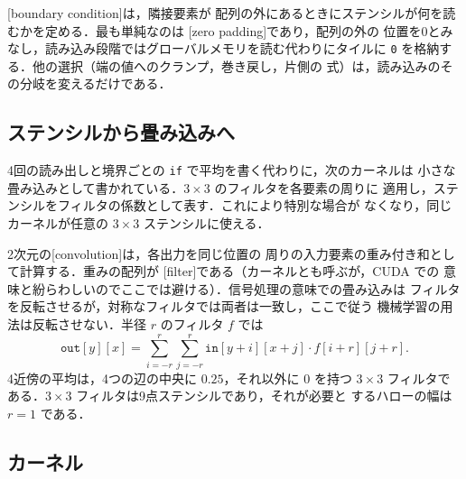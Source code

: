 \documentclass[../main.tex]{subfiles}
\begin{document}
\begin{definition}
  [boundary condition]は，隣接要素が
  配列の外にあるときにステンシルが何を読むかを定める．最も単純なのは
  [zero padding]であり，配列の外の
  位置を0とみなし，読み込み段階ではグローバルメモリを読む代わりにタイルに
  \texttt{0} を格納する．他の選択（端の値へのクランプ，巻き戻し，片側の
  式）は，読み込みのその分岐を変えるだけである．
\end{definition}

\subsection{ステンシルから畳み込みへ}

4回の読み出しと境界ごとの \texttt{if} で平均を書く代わりに，次のカーネルは
小さな畳み込みとして書かれている．$3\times3$ のフィルタを各要素の周りに
適用し，ステンシルをフィルタの係数として表す．これにより特別な場合が
なくなり，同じカーネルが任意の $3\times3$ ステンシルに使える．

\begin{definition}
  2次元の[convolution]は，各出力を同じ位置の
  周りの入力要素の重み付き和として計算する．重みの配列が
  [filter]である（カーネルとも呼ぶが，CUDA での
  意味と紛らわしいのでここでは避ける）．信号処理の意味での畳み込みは
  フィルタを反転させるが，対称なフィルタでは両者は一致し，ここで従う
  機械学習の用法は反転させない．半径 $r$ のフィルタ $f$ では
  \begin{equation}
    \texttt{out}[y][x] = \sum_{i=-r}^{r} \sum_{j=-r}^{r}
      \texttt{in}[y+i][x+j] \cdot f[i+r][j+r].
    \label{eq:l03-convolution}
  \end{equation}
  4近傍の平均は，4つの辺の中央に $0.25$，それ以外に $0$ を持つ $3\times3$
  フィルタである．$3\times3$ フィルタは9点ステンシルであり，それが必要と
  するハローの幅は $r = 1$ である．
\end{definition}

\subsection{カーネル}

\begin{marginfigure}
  \resizebox{\linewidth}{!}{}
  \caption{1つのブロック内のスレッドの役割（$8\times8$ スレッドで描画）：
    外周のスレッドはハローセルを読み込むだけで，内側のスレッドは読み込みと
    計算を行う．}
  \label{fig:l03-tile-threads}
\end{marginfigure}
\end{document}
